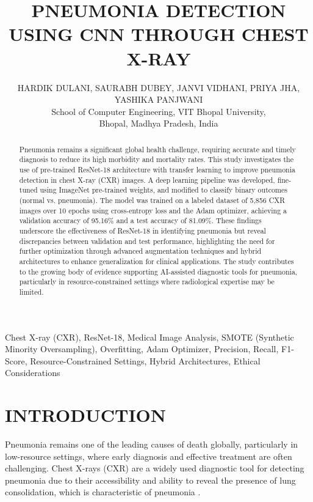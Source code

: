 \documentclass[
  twocolumn,
  10pt,
  a4paper,
  journal
]{IEEEtran}
\begin{document}
\title{PNEUMONIA DETECTION USING CNN THROUGH CHEST X-RAY}

\author{HARDIK DULANI, SAURABH DUBEY, JANVI VIDHANI, PRIYA JHA, YASHIKA PANJWANI\\
\small School of Computer Engineering, VIT Bhopal University,\\
\small Bhopal, Madhya Pradesh, India}

\maketitle

\begin{abstract}
Pneumonia remains a significant global health challenge, requiring accurate and timely diagnosis to reduce its high morbidity and mortality rates. This study investigates the use of pre-trained ResNet-18 architecture with transfer learning to improve pneumonia detection in chest X-ray (CXR) images. A deep learning pipeline was developed, fine-tuned using ImageNet pre-trained weights, and modified to classify binary outcomes (normal vs. pneumonia). The model was trained on a labeled dataset of 5,856 CXR images over 10 epochs using cross-entropy loss and the Adam optimizer, achieving a validation accuracy of 95.16\% and a test accuracy of 81.09\%. These findings underscore the effectiveness of ResNet-18 in identifying pneumonia but reveal discrepancies between validation and test performance, highlighting the need for further optimization through advanced augmentation techniques and hybrid architectures to enhance generalization for clinical applications. The study contributes to the growing body of evidence supporting AI-assisted diagnostic tools for pneumonia, particularly in resource-constrained settings where radiological expertise may be limited.
\end{abstract}

\begin{IEEEkeywords}
Chest X-ray (CXR), ResNet-18, Medical Image Analysis, SMOTE (Synthetic Minority Oversampling), Overfitting, Adam Optimizer, Precision, Recall, F1-Score, Resource-Constrained Settings, Hybrid Architectures, Ethical Considerations
\end{IEEEkeywords}

\section{INTRODUCTION}

Pneumonia remains one of the leading causes of death globally, particularly in low-resource settings, where early diagnosis and effective treatment are often challenging. Chest X-rays (CXR) are a widely used diagnostic tool for detecting pneumonia due to their accessibility and ability to reveal the presence of lung consolidation, which is characteristic of pneumonia \cite{rajpurkar2017}.
\end{document}
